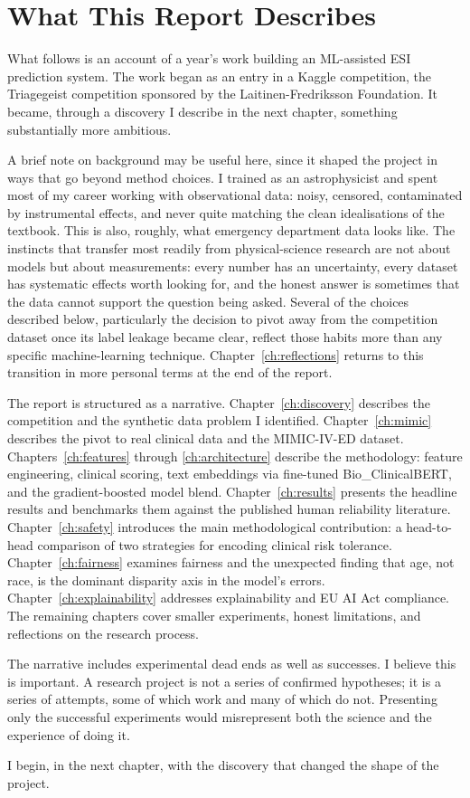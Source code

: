 \section{What This Report Describes}

What follows is an account of a year's work building an ML-assisted ESI prediction system. The work began as an entry in a Kaggle competition, the Triagegeist competition sponsored by the Laitinen-Fredriksson Foundation. It became, through a discovery I describe in the next chapter, something substantially more ambitious.

A brief note on background may be useful here, since it shaped the project in ways that go beyond method choices. I trained as an astrophysicist and spent most of my career working with observational data: noisy, censored, contaminated by instrumental effects, and never quite matching the clean idealisations of the textbook. This is also, roughly, what emergency department data looks like. The instincts that transfer most readily from physical-science research are not about models but about measurements: every number has an uncertainty, every dataset has systematic effects worth looking for, and the honest answer is sometimes that the data cannot support the question being asked. Several of the choices described below, particularly the decision to pivot away from the competition dataset once its label leakage became clear, reflect those habits more than any specific machine-learning technique. Chapter~\ref{ch:reflections} returns to this transition in more personal terms at the end of the report.

The report is structured as a narrative. Chapter~\ref{ch:discovery} describes the competition and the synthetic data problem I identified. Chapter~\ref{ch:mimic} describes the pivot to real clinical data and the MIMIC-IV-ED dataset. Chapters~\ref{ch:features} through \ref{ch:architecture} describe the methodology: feature engineering, clinical scoring, text embeddings via fine-tuned Bio\_ClinicalBERT, and the gradient-boosted model blend. Chapter~\ref{ch:results} presents the headline results and benchmarks them against the published human reliability literature. Chapter~\ref{ch:safety} introduces the main methodological contribution: a head-to-head comparison of two strategies for encoding clinical risk tolerance. Chapter~\ref{ch:fairness} examines fairness and the unexpected finding that age, not race, is the dominant disparity axis in the model's errors. Chapter~\ref{ch:explainability} addresses explainability and EU AI Act compliance. The remaining chapters cover smaller experiments, honest limitations, and reflections on the research process.

The narrative includes experimental dead ends as well as successes. I believe this is important. A research project is not a series of confirmed hypotheses; it is a series of attempts, some of which work and many of which do not. Presenting only the successful experiments would misrepresent both the science and the experience of doing it.

I begin, in the next chapter, with the discovery that changed the shape of the project.
